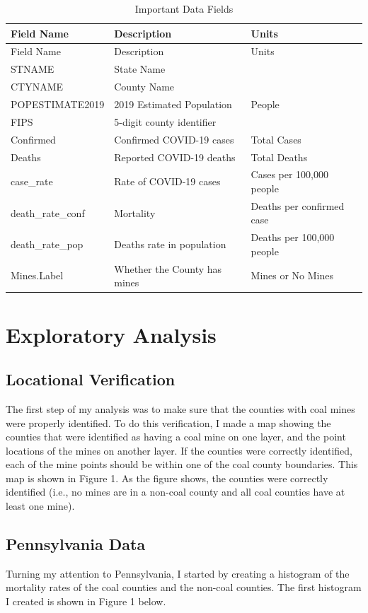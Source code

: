 \documentclass[
  12pt,
]{article}
\begin{document}
\begin{longtable}[]{@{}lll@{}}
\caption{Important Data Fields}\tabularnewline
\toprule
Field Name & Description & Units\tabularnewline
\midrule
\endfirsthead
\toprule
Field Name & Description & Units\tabularnewline
\midrule
\endhead
STNAME & State Name &\tabularnewline
CTYNAME & County Name &\tabularnewline
POPESTIMATE2019 & 2019 Estimated Population & People\tabularnewline
FIPS & 5-digit county identifier &\tabularnewline
Confirmed & Confirmed COVID-19 cases & Total Cases\tabularnewline
Deaths & Reported COVID-19 deaths & Total Deaths\tabularnewline
case\_rate & Rate of COVID-19 cases & Cases per 100,000
people\tabularnewline
death\_rate\_conf & Mortality & Deaths per confirmed case\tabularnewline
death\_rate\_pop & Deaths rate in population & Deaths per 100,000
people\tabularnewline
Mines.Label & Whether the County has mines & Mines or No
Mines\tabularnewline
\bottomrule
\end{longtable}

\newpage

\hypertarget{exploratory-analysis}{%
\section{Exploratory Analysis}\label{exploratory-analysis}}

\hypertarget{locational-verification}{%
\subsection{Locational Verification}\label{locational-verification}}

The first step of my analysis was to make sure that the counties with
coal mines were properly identified. To do this verification, I made a
map showing the counties that were identified as having a coal mine on
one layer, and the point locations of the mines on another layer. If the
counties were correctly identified, each of the mine points should be
within one of the coal county boundaries. This map is shown in Figure 1.
As the figure shows, the counties were correctly identified (i.e., no
mines are in a non-coal county and all coal counties have at least one
mine).

\hypertarget{pennsylvania-data}{%
\subsection{Pennsylvania Data}\label{pennsylvania-data}}

Turning my attention to Pennsylvania, I started by creating a histogram
of the mortality rates of the coal counties and the non-coal counties.
The first histogram I created is shown in Figure 1 below.
\end{document}

